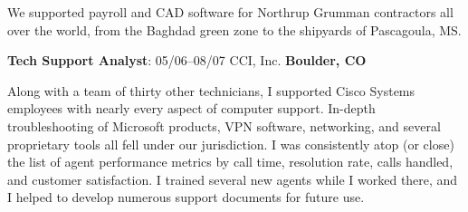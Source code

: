 \documentclass[a4paper,12pt]{article}
\begin{document}
We supported payroll and CAD software for Northrup Grumman contractors all over
the world, from the Baghdad green zone to the shipyards of Pascagoula, MS.

\begin{flushleft}
\textbf{Tech Support Analyst}: 05/06--08/07 CCI, Inc. \textbf{Boulder, CO}
\end{flushleft}

Along with a team of thirty other technicians, I supported Cisco Systems
employees with nearly every aspect of computer support. In-depth
troubleshooting of Microsoft products, VPN software, networking, and several
proprietary tools all fell under our jurisdiction. I was consistently atop
(or close) the list of agent performance metrics by call time, resolution rate,
calls handled, and customer satisfaction. I trained several new agents while
I worked there, and I helped to develop numerous support documents for future
use.
\end{document}
